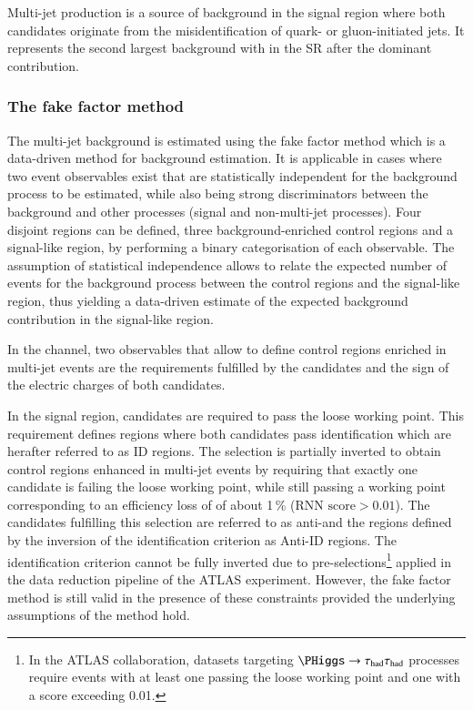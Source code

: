 \label{sec:hadhad_multijet}

Multi-jet production is a source of background in the \hadhad signal
region where both \tauhadvis candidates originate from the
misidentification of quark- or gluon-initiated jets. It represents the
second largest background with \faketauhadvis in the \hadhad SR after
the dominant \ttbarFakes contribution.

\subsubsection{The fake factor method}

The multi-jet background is estimated using the fake factor method
which is a data-driven method for background estimation. It is
applicable in cases where two event observables exist that are
statistically independent for the background process to be estimated,
while also being strong discriminators between the background and
other processes (signal and non-multi-jet processes). Four disjoint
regions can be defined, three background-enriched control regions and
a signal-like region, by performing a binary categorisation of each
observable. The assumption of statistical independence allows to
relate the expected number of events for the background process
between the control regions and the signal-like region, thus yielding
a data-driven estimate of the expected background contribution in the
signal-like region.

In the \hadhad channel, two observables that allow to define control
regions enriched in multi-jet events are the \tauid requirements
fulfilled by the \tauhadvis candidates and the sign of the electric
charges of both candidates.

In the signal region, \tauhadvis candidates are required to pass the
loose \tauid working point. This requirement defines regions where
both \tauhadvis candidates pass identification which are herafter
referred to as ID regions. The selection is partially inverted to
obtain control regions enhanced in multi-jet events by requiring that
exactly one \tauhadvis candidate is failing the loose \tauid working
point, while still passing a working point corresponding to an
efficiency loss of \tauhad of about 1\,\% ($\text{RNN score} >
0.01$). The \tauhadvis candidates fulfilling this selection are
referred to as anti-\tauhadvis and the regions defined by the
inversion of the identification criterion as Anti-ID regions. The
identification criterion cannot be fully inverted due to
pre-selections\footnote{In the ATLAS collaboration, datasets targeting
  $\PHiggs \to \hadhad$ processes require events with at least one
  \tauhadvis passing the loose \tauid working point and one \tauhadvis
  with a \tauid score exceeding 0.01.} applied in the data reduction
pipeline of the ATLAS experiment. However, the fake factor method is
still valid in the presence of these constraints provided the
underlying assumptions of the method hold.

